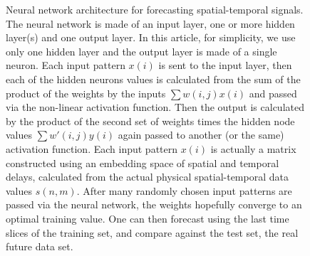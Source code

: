 \documentclass[journal]{IEEEtran}
\begin{document}
\begin{figure}[!htb]
\caption{Neural network architecture for forecasting spatial-temporal signals. 
The neural network is made of an input layer, one or more hidden layer(s) and one output layer.
In this article, for simplicity, we use only one hidden layer and the output layer is made of a single neuron. 
Each input pattern $x(i)$ is sent to the
input layer, then each of the hidden neurons values is calculated from the sum of the product of the weights by the inputs $\sum w(i,j) x(i)$
and passed via the non-linear activation function. Then the output is calculated by the product of the second set of
weights times the hidden node values $\sum w'(i,j) y(i)$ again passed to another (or the same) activation function.
Each input pattern $x(i)$ is actually a matrix constructed using an embedding space of
spatial and temporal delays, calculated from the actual physical spatial-temporal data values $s(n,m)$. After many randomly chosen input patterns
are passed via the neural network, the weights hopefully converge to an optimal training value. One can then forecast using the last
time slices of the training set, and compare against the test set, the real future data set.}
\label{architecture}
\end{figure}
\end{document}
